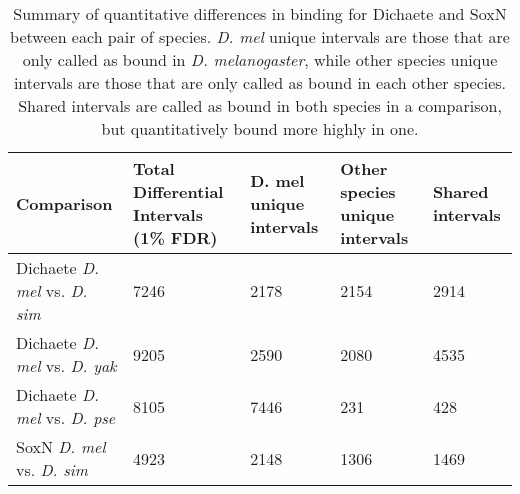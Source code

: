 \begin{table}[h]
\centering
\begin{tabular}{|p{3cm}|p{2.5cm}|p{2.5cm}|p{2.5cm}|p{2.5cm}|}
\hline
\textbf{Comparison}                 & \textbf{Total Differential Intervals (1\% FDR)} & \textbf{D. mel unique intervals} & \textbf{Other species unique intervals} & \textbf{Shared intervals} \\ \hline
Dichaete \emph{D. mel} vs. \emph{D. sim} & 7246                                   & 2178                    & 2154                           & 2914             \\ \hline
Dichaete \emph{D. mel} vs. \emph{D. yak} & 9205                                   & 2590                    & 2080                           & 4535             \\ \hline
Dichaete \emph{D. mel} vs. \emph{D. pse} & 8105                                   & 7446                    & 231                            & 428              \\ \hline
SoxN \emph{D. mel} vs. \emph{D. sim}     & 4923                                   & 2148                    & 1306                           & 1469             \\ \hline
\end{tabular}
\caption{Summary of quantitative differences in binding for Dichaete and SoxN between each pair of species. \emph{D. mel} unique intervals are those that are only called as bound in \emph{D. melanogaster}, while other species unique intervals are those that are only called as bound in each other species. Shared intervals are called as bound in both species in a comparison, but quantitatively bound more highly in one.}
\label{Table 5.1}
\end{table}


